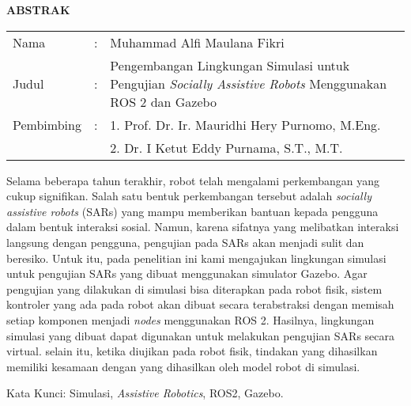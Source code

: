 \begin{center}
  \large\textbf{ABSTRAK}
\end{center}

\vspace{2ex}

\begingroup
  \setlength{\tabcolsep}{0pt}
  \noindent
  \begin{tabularx}{\textwidth}{l >{\centering}m{2em} X}
    Nama        &:& Muhammad Alfi Maulana Fikri \\
    Judul       &:&	Pengembangan Lingkungan Simulasi untuk Pengujian \emph{Socially Assistive Robots} Menggunakan ROS 2 dan Gazebo \\
    Pembimbing  &:& 1. Prof. Dr. Ir. Mauridhi Hery Purnomo, M.Eng. \\
                & & 2. Dr. I Ketut Eddy Purnama, S.T., M.T. \\
  \end{tabularx}
\endgroup

Selama beberapa tahun terakhir,
  robot telah mengalami perkembangan yang cukup signifikan.
Salah satu bentuk perkembangan tersebut adalah \emph{socially assistive robots} (SARs) yang mampu memberikan bantuan kepada pengguna dalam bentuk interaksi sosial.
Namun, karena sifatnya yang melibatkan interaksi langsung dengan pengguna,
  pengujian pada SARs akan menjadi sulit dan beresiko.
Untuk itu, pada penelitian ini kami mengajukan lingkungan simulasi untuk pengujian SARs yang dibuat menggunakan simulator Gazebo.
Agar pengujian yang dilakukan di simulasi bisa diterapkan pada robot fisik,
  sistem kontroler yang ada pada robot akan dibuat secara terabstraksi dengan memisah setiap komponen menjadi \emph{nodes} menggunakan ROS 2.
Hasilnya,
  lingkungan simulasi yang dibuat dapat digunakan untuk melakukan pengujian SARs secara virtual.
selain itu, ketika diujikan pada robot fisik,
  tindakan yang dihasilkan memiliki kesamaan dengan yang dihasilkan oleh model robot di simulasi.

Kata Kunci: Simulasi, \emph{Assistive Robotics}, ROS2, Gazebo.
